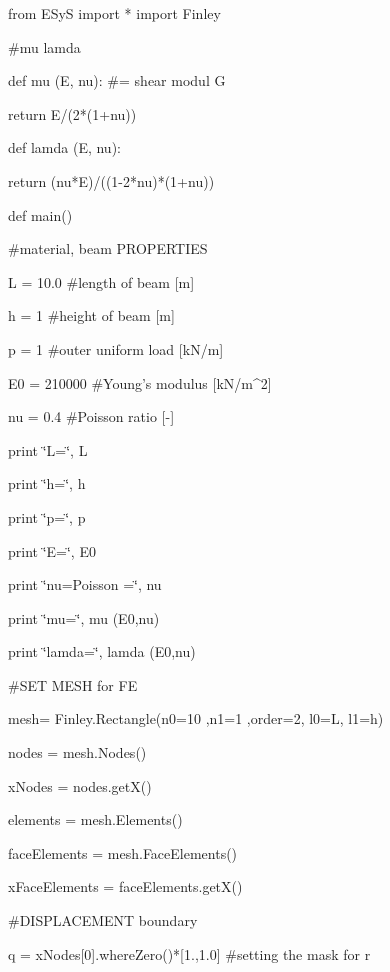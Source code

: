 \begin{python}
from ESyS import {*}
import Finley



\#mu lamda

def mu (E, nu): \#= shear modul G

     return E/(2{*}(1+nu))

def lamda (E, nu):

     return (nu{*}E)/((1-2{*}nu){*}(1+nu))



def main()

     \#material, beam PROPERTIES

     L = 10.0         \#length of beam {[}m{]}

     h = 1            \#height of beam {[}m{]}

     p = 1            \#outer uniform load {[}kN/m{]}

     E0 = 210000      \#Young's modulus {[}kN/m\textasciicircum{}2{]}

     nu = 0.4         \#Poisson ratio {[}-{]}



     print \char`\"{}L=\char`\"{}, L

     print \char`\"{}h=\char`\"{}, h

     print \char`\"{}p=\char`\"{}, p

     print \char`\"{}E=\char`\"{}, E0

     print \char`\"{}nu=Poisson =\char`\"{}, nu

     print \char`\"{}mu=\char`\"{}, mu (E0,nu)

     print \char`\"{}lamda=\char`\"{}, lamda (E0,nu) 



     \#SET MESH for FE

     mesh= Finley.Rectangle(n0=10 ,n1=1 ,order=2, l0=L, l1=h)

     nodes = mesh.Nodes()

     xNodes = nodes.getX()

     elements = mesh.Elements()

     faceElements = mesh.FaceElements()

     xFaceElements = faceElements.getX()



     \#DISPLACEMENT boundary

     q = xNodes{[}0{]}.whereZero(){*}{[}1.,1.0{]}    \#setting the                                           mask for r


\end{python}
